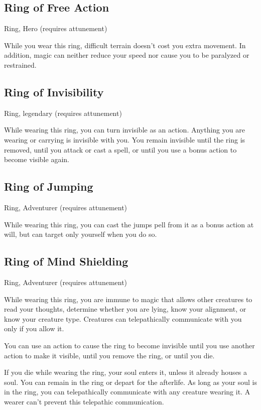\subsection{Ring of Free Action}
Ring, Hero (requires attunement)

While you wear this ring, difficult terrain doesn't cost you extra movement. In addition, magic can neither reduce your speed nor cause you to be paralyzed or restrained.

\subsection{Ring of Invisibility}
Ring, legendary (requires attunement)

While wearing this ring, you can turn invisible as an action. Anything you are wearing or carrying is invisible with you. You remain invisible until the ring is removed, until you attack or cast a spell, or until you use a bonus action to become visible again.

\subsection{Ring of Jumping}
Ring, Adventurer (requires attunement)

While wearing this ring, you can cast the jumps pell from it as a bonus action at will, but can target only yourself when you do so.

\subsection{Ring of Mind Shielding}
Ring, Adventurer (requires attunement)

While wearing this ring, you are immune to magic that allows other creatures to read your thoughts, determine whether you are lying, know your alignment, or know your creature type. Creatures can telepathically communicate with you only if you allow it.

You can use an action to cause the ring to become invisible until you use another action to make it visible, until you remove the ring, or until you die.

If you die while wearing the ring, your soul enters it, unless it already houses a soul. You can remain in the ring or depart for the afterlife. As long as your soul is in the ring, you can telepathically communicate with any creature wearing it. A wearer can't prevent this telepathic communication.

